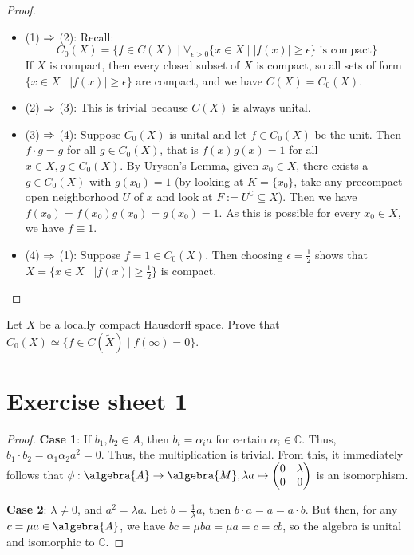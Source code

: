 \documentclass[a4paper]{article}
\begin{document}
\begin{proof}~
	\begin{itemize}
		\item (1) $\Rightarrow$ (2): Recall:
		\begin{equation*}
			C_0(X) = \{f \in C(X) \mid \forall_{\epsilon > 0} \{x \in X \mid |f(x)| \geq \epsilon \} \text{ is compact} \}
		\end{equation*}
		If $X$ is compact, then every closed subset of $X$ is compact, so all sets of form $\{ x \in X \mid |f(x)| \geq \epsilon \}$ are compact, and we have $C(X) = C_0(X)$.
		\item (2) $\Rightarrow$ (3): This is trivial because $C(X)$ is always unital.
		\item (3) $\Rightarrow$ (4): Suppose $C_0(X)$ is unital and let $f \in C_0(X)$ be the unit.
		Then $f \cdot g = g$ for all $g \in C_0(X)$, that is $f(x) g(x) = 1$ for all $x \in X, g \in C_0(X)$.
		By Uryson's Lemma, given $x_0 \in X$, there exists a $g \in C_0(X)$ with $g(x_0) = 1$ (by looking at $K = \{x_0\}$, take any precompact open neighborhood $U$ of $x$ and look at $ F := U^\complement \subseteq X$).
		Then we have $f(x_0) = f(x_0) g(x_0) = g(x_0) = 1$.
		As this is possible for every $x_0 \in X$, we have $f \equiv 1$.
		\item (4) $\Rightarrow$ (1): Suppose $f = 1 \in C_0(X)$.
		Then choosing $\epsilon = \frac{1}{2}$ shows that $X = \{ x \in X \mid |f(x)| \geq \frac{1}{2} \}$ is compact.
	\end{itemize}

\end{proof}

\begin{exercise}
	Let $X$ be a locally compact Hausdorff space. Prove that $C_0(X) \simeq \{f \in C(\tilde X) \mid f(\infty) = 0 \}$.
\end{exercise}


\section{Exercise sheet 1}

\begin{exercise}[1.1]
\end{exercise}

\begin{proof}
	\textbf{Case 1}: If $b_1, b_2 \in A$, then $b_i = \alpha_i a$ for certain $\alpha_i \in \mathbb{C}$. Thus, $b_1 \cdot b_2 = \alpha_1 \alpha_2 a^2 = 0$. Thus, the multiplication is trivial. From this, it immediately follows that $\phi: \algebra{A} \to \algebra{M}, \lambda a \mapsto \qmatrix{0 & \lambda \\ 0 & 0}$ is an isomorphism.

	\textbf{Case 2}: $\lambda \neq 0$, and $a^2 = \lambda a$. Let $b = \frac{1}{\lambda} a$, then $b \cdot a = a = a \cdot b$. But then, for any $c = \mu a \in \algebra{A}$, we have $b c = \mu b a = \mu a = c = c b$, so the algebra is unital and isomorphic to $\mathbb{C}$.
\end{proof}
\end{document}
